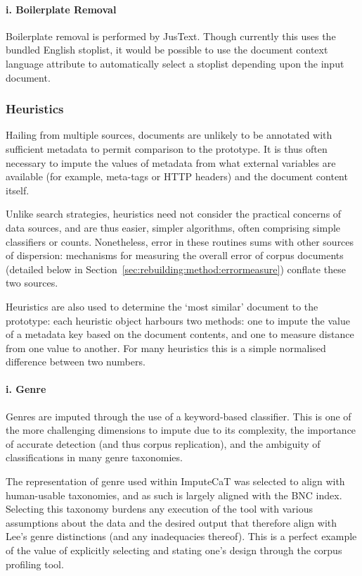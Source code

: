\paragraph{i. Boilerplate Removal}
Boilerplate removal is performed by JusText\cite{pomikalek2013justext}.  Though currently this uses the bundled English stoplist, it would be possible to use the document context language attribute to automatically select a stoplist depending upon the input document.




\subsubsection{Heuristics}
Hailing from multiple sources, documents are unlikely to be annotated with sufficient metadata to permit comparison to the prototype.  It is thus often necessary to impute the values of metadata from what external variables are available (for example, meta-tags or HTTP headers) and the document content itself.

Unlike search strategies, heuristics need not consider the practical concerns of data sources, and are thus easier, simpler algorithms, often comprising simple classifiers or counts.  Nonetheless, error in these routines sums with other sources of dispersion: mechanisms for measuring the overall error of corpus documents (detailed below in Section~\ref{sec:rebuilding:method:errormeasure}) conflate these two sources.

Heuristics are also used to determine the `most similar' document to the prototype: each heuristic object harbours two methods: one to impute the value of a metadata key based on the document contents, and one to measure distance from one value to another.  For many heuristics this is a simple normalised difference between two numbers.


\paragraph{i. Genre}
Genres are imputed through the use of a keyword-based classifier.  This is one of the more challenging dimensions to impute due to its complexity, the importance of accurate detection (and thus corpus replication), and the ambiguity of classifications in many genre taxonomies.

The representation of genre used within ImputeCaT was selected to align with human-usable taxonomies, and as such is largely aligned with the BNC index\cite{lee2001genres}.  Selecting this taxonomy burdens any execution of the tool with various assumptions about the data and the desired output that therefore align with Lee's genre distinctions (and any inadequacies thereof).  This is a perfect example of the value of explicitly selecting and stating one's design through the corpus profiling tool.


